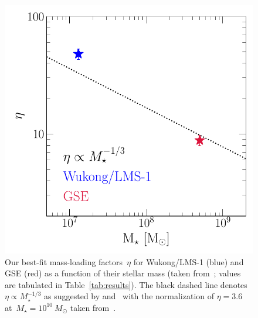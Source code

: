 \documentclass[foo.tex]{subfiles}
\begin{document}
\begin{figure}
\centering
\includegraphics[scale = 0.6]{gse_wukong_eta.pdf}
\caption{
Our best-fit mass-loading factors~$\eta$ for Wukong/LMS-1 (blue) and GSE (red) as
a function of their stellar mass (taken from~\citealt{Naidu2022}; values are
tabulated in Table~\ref{tab:results}).
The black dashed line denotes~$\eta \propto M_\star^{-1/3}$ as suggested by
\citet{Finlator2008} and~\citet{Peeples2011} with the normalization of
$\eta = 3.6$ at~$M_\star = 10^{10}~M_\odot$ taken from~\citet{Muratov2015}.
}
\label{fig:gse_wukong_eta}
\end{figure}
\end{document}
